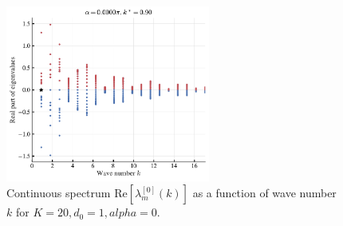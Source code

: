 \documentclass{article}
\begin{document}
\begin{figure}[H]
    \centering
    \includegraphics[width=0.6\textwidth]{./figs/continuous_spectrum_uniform_sync.pdf}
    \caption{
        Continuous spectrum $\mathrm{Re}[ \lambda _{m}^{\left[ 0 \right]}\left( k \right) ]$ as a function of wave number $k$ for $K=20, d_0=1, alpha=0$.
    }
\end{figure}


\end{document}
